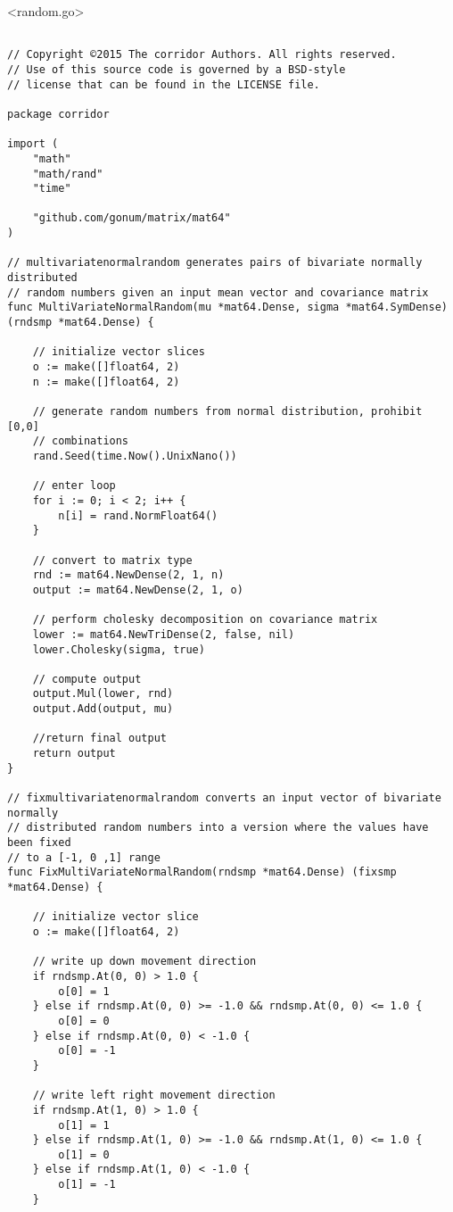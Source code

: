 \newpage

<random.go>

\begin{lstlisting}[basicstyle=\tiny]

// Copyright ©2015 The corridor Authors. All rights reserved.
// Use of this source code is governed by a BSD-style
// license that can be found in the LICENSE file.

package corridor

import (
	"math"
	"math/rand"
	"time"

	"github.com/gonum/matrix/mat64"
)

// multivariatenormalrandom generates pairs of bivariate normally distributed
// random numbers given an input mean vector and covariance matrix
func MultiVariateNormalRandom(mu *mat64.Dense, sigma *mat64.SymDense) (rndsmp *mat64.Dense) {

	// initialize vector slices
	o := make([]float64, 2)
	n := make([]float64, 2)

	// generate random numbers from normal distribution, prohibit [0,0]
	// combinations
	rand.Seed(time.Now().UnixNano())

	// enter loop
	for i := 0; i < 2; i++ {
		n[i] = rand.NormFloat64()
	}

	// convert to matrix type
	rnd := mat64.NewDense(2, 1, n)
	output := mat64.NewDense(2, 1, o)

	// perform cholesky decomposition on covariance matrix
	lower := mat64.NewTriDense(2, false, nil)
	lower.Cholesky(sigma, true)

	// compute output
	output.Mul(lower, rnd)
	output.Add(output, mu)

	//return final output
	return output
}

// fixmultivariatenormalrandom converts an input vector of bivariate normally
// distributed random numbers into a version where the values have been fixed
// to a [-1, 0 ,1] range
func FixMultiVariateNormalRandom(rndsmp *mat64.Dense) (fixsmp *mat64.Dense) {

	// initialize vector slice
	o := make([]float64, 2)

	// write up down movement direction
	if rndsmp.At(0, 0) > 1.0 {
		o[0] = 1
	} else if rndsmp.At(0, 0) >= -1.0 && rndsmp.At(0, 0) <= 1.0 {
		o[0] = 0
	} else if rndsmp.At(0, 0) < -1.0 {
		o[0] = -1
	}

	// write left right movement direction
	if rndsmp.At(1, 0) > 1.0 {
		o[1] = 1
	} else if rndsmp.At(1, 0) >= -1.0 && rndsmp.At(1, 0) <= 1.0 {
		o[1] = 0
	} else if rndsmp.At(1, 0) < -1.0 {
		o[1] = -1
	}


\end{lstlisting}
